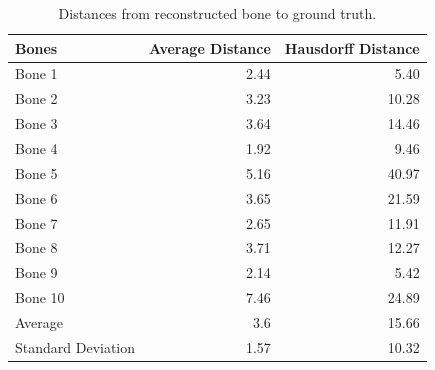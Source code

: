 \begin{table}
  \centering
  \caption{Distances from reconstructed bone to ground truth.}
  \label{tbl:reconstructed_distance}
  \begin{tabular}{lrr}
    \toprule
      \textbf{Bones} &
      Average Distance &
      Hausdorff Distance \\
    \midrule
      Bone 1& 2.44 & 5.40 \\
      Bone 2& 3.23 & 10.28 \\
      Bone 3& 3.64 & 14.46 \\
      Bone 4& 1.92 & 9.46 \\
      Bone 5& 5.16 & 40.97 \\
      Bone 6& 3.65 & 21.59 \\
      Bone 7& 2.65 & 11.91 \\
      Bone 8& 3.71 & 12.27 \\
      Bone 9& 2.14 & 5.42 \\
      Bone 10& 7.46 & 24.89 \\
    \midrule
      Average& 3.6 & 15.66 \\
      Standard Deviation& 1.57 & 10.32 \\
    \bottomrule
  \end{tabular}
\end{table}
